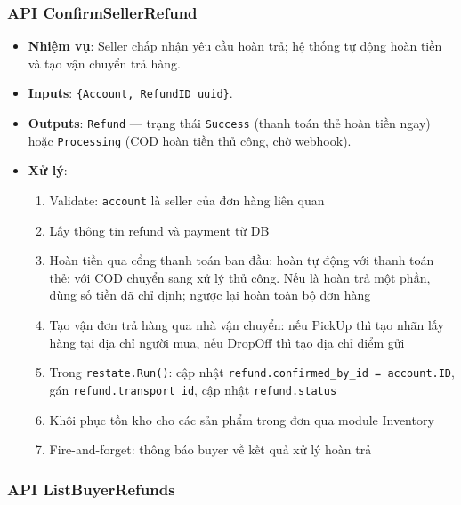 \subsubsection{API ConfirmSellerRefund}
\label{subsubsec:api-confirm-seller-refund}

\begin{itemize}[leftmargin=*]
  \item \textbf{Nhiệm vụ}: Seller chấp nhận yêu cầu hoàn trả; hệ thống tự động hoàn tiền và tạo vận chuyển trả hàng.
  \item \textbf{Inputs}: \texttt{\{Account, RefundID uuid\}}.
  \item \textbf{Outputs}: \texttt{Refund} — trạng thái \texttt{Success} (thanh toán thẻ hoàn tiền ngay) hoặc \texttt{Processing} (COD hoàn tiền thủ công, chờ webhook).
  \item \textbf{Xử lý}:
    \begin{enumerate}
      \item Validate: \texttt{account} là seller của đơn hàng liên quan
      \item Lấy thông tin refund và payment từ DB
      \item Hoàn tiền qua cổng thanh toán ban đầu: hoàn tự động với thanh toán thẻ; với COD chuyển sang xử lý thủ công. Nếu là hoàn trả một phần, dùng số tiền đã chỉ định; ngược lại hoàn toàn bộ đơn hàng
      \item Tạo vận đơn trả hàng qua nhà vận chuyển: nếu PickUp thì tạo nhãn lấy hàng tại địa chỉ người mua, nếu DropOff thì tạo địa chỉ điểm gửi
      \item Trong \texttt{restate.Run()}: cập nhật \texttt{refund.confirmed\_by\_id = account.ID}, gán \texttt{refund.\allowbreak transport\_id}, cập nhật \texttt{refund.status}
      \item Khôi phục tồn kho cho các sản phẩm trong đơn qua module Inventory
      \item Fire-and-forget: thông báo buyer về kết quả xử lý hoàn trả
    \end{enumerate}
\end{itemize}

\subsubsection{API ListBuyerRefunds}
\label{subsubsec:api-list-buyer-refunds}

